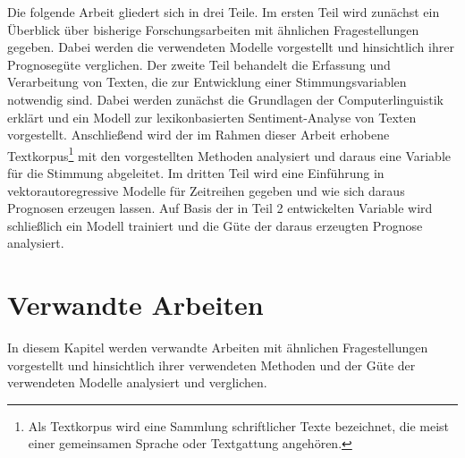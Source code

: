 \documentclass[
	a4paper,
	12pt,
	bibliography=totocnumbered,
	twoside,
]{scrreprt}
\begin{document}
\bigskip
Die folgende Arbeit gliedert sich in drei Teile. Im ersten Teil wird zunächst ein Überblick über bisherige Forschungsarbeiten mit ähnlichen Fragestellungen gegeben. Dabei werden die verwendeten Modelle vorgestellt und hinsichtlich ihrer Prognosegüte verglichen. Der zweite Teil behandelt die Erfassung und Verarbeitung von Texten, die zur Entwicklung einer Stimmungsvariablen notwendig sind. Dabei werden zunächst die Grundlagen der Computerlinguistik erklärt und ein Modell zur lexikonbasierten Sentiment-Analyse von Texten vorgestellt. Anschließend wird der im Rahmen dieser Arbeit erhobene Textkorpus\footnote{Als Textkorpus wird eine Sammlung schriftlicher Texte bezeichnet, die meist einer gemeinsamen Sprache oder Textgattung angehören.} mit den vorgestellten Methoden analysiert und daraus eine Variable für die Stimmung abgeleitet. Im dritten Teil wird eine Einführung in vektorautoregressive Modelle für Zeitreihen gegeben und wie sich daraus Prognosen erzeugen lassen. Auf Basis der in Teil 2 entwickelten Variable wird schließlich ein Modell trainiert und die Güte der daraus erzeugten Prognose analysiert.






\chapter{Verwandte Arbeiten}
\label{ch:similiar-work}

In diesem Kapitel werden verwandte Arbeiten mit ähnlichen Fragestellungen vorgestellt und hinsichtlich ihrer verwendeten Methoden und der Güte der verwendeten Modelle analysiert und verglichen.\\


\end{document}
